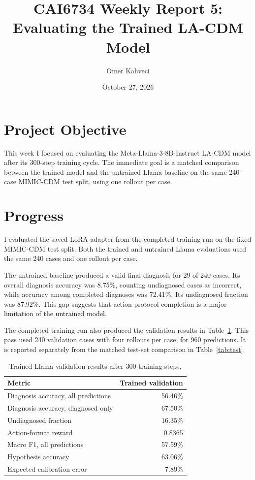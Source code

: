 \documentclass[11pt]{article}
\title{CAI6734 Weekly Report 5: Evaluating the Trained LA-CDM Model}
\author{Omer Kahveci}
\date{October 27, 2026}
\begin{document}
\maketitle

\section{Project Objective}

This week I focused on evaluating the Meta-Llama-3-8B-Instruct LA-CDM model
after its 300-step training cycle. The immediate goal is a matched comparison
between the trained model and the untrained Llama baseline on the same
240-case MIMIC-CDM test split, using one rollout per case.

\section{Progress}

I evaluated the saved LoRA adapter from the completed training run on the
fixed MIMIC-CDM test split. Both the trained and untrained Llama evaluations
used the same 240 cases and one rollout per case.

The untrained baseline produced a valid final diagnosis for 29 of 240 cases.
Its overall diagnosis accuracy was 8.75\%, counting undiagnosed cases as
incorrect, while accuracy among completed diagnoses was 72.41\%. Its
undiagnosed fraction was 87.92\%. This gap suggests that action-protocol
completion is a major limitation of the untrained model.

The completed training run also produced the validation results in
Table~\ref{tab:validation}. This pass used 240 validation cases with four
rollouts per case, for 960 predictions. It is reported separately from the
matched test-set comparison in Table~\ref{tab:test}.

\begin{table}[ht]
  \centering
  \caption{Trained Llama validation results after 300 training steps.}
  \label{tab:validation}
  \begin{tabular}{lr}
    \toprule
    Metric & Trained validation \\
    \midrule
    Diagnosis accuracy, all predictions & 56.46\% \\
    Diagnosis accuracy, diagnosed only & 67.50\% \\
    Undiagnosed fraction & 16.35\% \\
    Action-format reward & 0.8365 \\
    Macro F1, all predictions & 57.59\% \\
    Hypothesis accuracy & 63.06\% \\
    Expected calibration error & 7.89\% \\
    \bottomrule
  \end{tabular}
\end{table}
\end{document}

